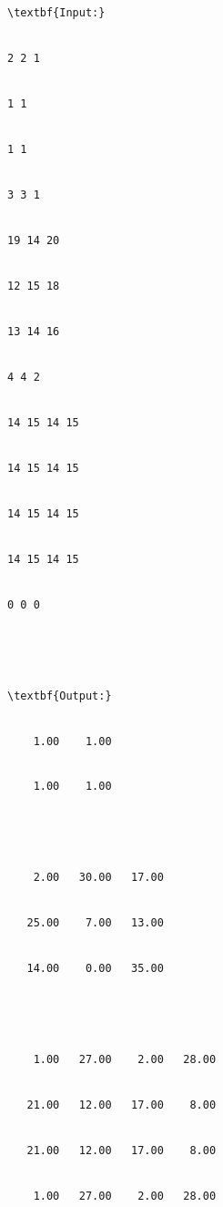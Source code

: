 \begin{verbatim}
\textbf{Input:}


2 2 1


1 1


1 1


3 3 1


19 14 20


12 15 18


13 14 16


4 4 2


14 15 14 15


14 15 14 15


14 15 14 15


14 15 14 15


0 0 0





\textbf{Output:}


    1.00    1.00 


    1.00    1.00





    2.00   30.00   17.00


   25.00    7.00   13.00


   14.00    0.00   35.00





    1.00   27.00    2.00   28.00


   21.00   12.00   17.00    8.00


   21.00   12.00   17.00    8.00


    1.00   27.00    2.00   28.00\end{verbatim}
